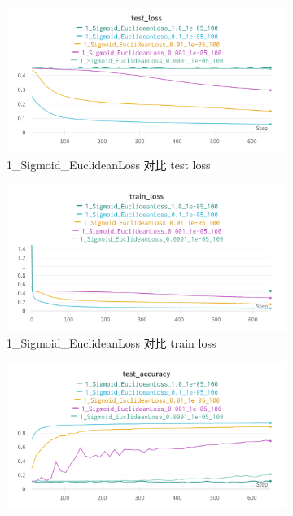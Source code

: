 \documentclass{article}
\begin{document}
\begin{figure}
	\centering
	\begin{subfigure}{0.475\textwidth}
		\centering
		\includegraphics[width=1\textwidth]{../pics/学习率_1_Sigmoid_EuclideanLoss_test_loss.png}
		\caption{1\_Sigmoid\_EuclideanLoss 对比 test loss}
	\end{subfigure}
	\begin{subfigure}{0.475\textwidth}
		\centering
		\includegraphics[width=1\textwidth]{../pics/学习率_1_Sigmoid_EuclideanLoss_train_loss.png}
		\caption{1\_Sigmoid\_EuclideanLoss 对比 train loss}
	\end{subfigure}
	\begin{subfigure}{0.475\textwidth}
		\centering
		\includegraphics[width=1\textwidth]{../pics/学习率_1_Sigmoid_EuclideanLoss_test_acc.png}

\end{subfigure}
\end{figure}
\end{document}
